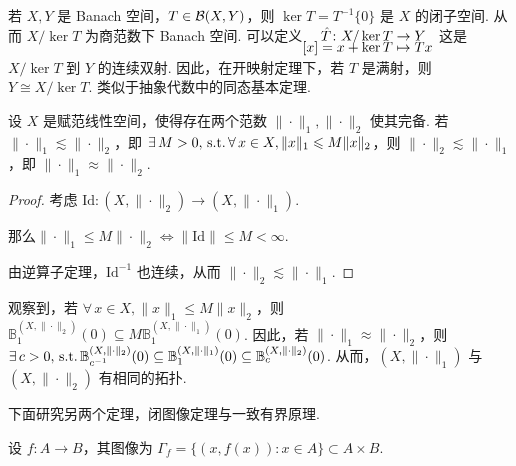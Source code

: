若 $X, Y$ 是 Banach 空间，$T \in \mathcal{B}(X,Y)$，则 $\ker T = T^{-1}\{0\}$ 是 $X$ 的闭子空间. 从而 $X/\ker T$ 为商范数下 Banach 空间.
可以定义$\setjot[-4]\begin{aligned}[t]
    \hat{T}\colon X/\ker T &\to Y \\
    [x]=x+\ker T &\mapsto  Tx
\end{aligned} $
这是 $X/\ker T$ 到 $Y$ 的连续双射.
因此，在开映射定理下，若 $T$ 是满射，则 $Y \cong X/\ker T$.
类似于抽象代数中的同态基本定理.

\begin{corollary}
    设 $X$ 是赋范线性空间，使得存在两个范数 $\|\cdot\|_1, \|\cdot\|_2$ 使其完备. 若 $\|\cdot\|_1 \lesssim \|\cdot\|_2$，即 $\exists\, M > 0, \operatorname{\,\text{s.t.}} \forall\, x \in X, \|x\|_1 \leqslant M\|x\|_2$，则 $\|\cdot\|_2 \lesssim \|\cdot\|_1$，即 $\|\cdot\|_1 \approx \|\cdot\|_2$.
\end{corollary}
\begin{proof}
    考虑 $\mathrm{Id}\colon (X, \|\cdot\|_2) \to (X, \|\cdot\|_1)$.\par
    那么$\| \cdot \|_1 \leq M \| \cdot \|_2 \iff \|\mathrm{Id}\| \le M < \infty$.\par
    由逆算子定理，$\mathrm{Id}^{-1}$ 也连续，从而 $\|\cdot\|_2 \lesssim \|\cdot\|_1$.
\end{proof}

观察到，若 $\forall\, x \in X, \|x\|_1 \leq M\|x\|_2$，则 $\mathbb{B}_1^{(X, \|\cdot\|_2)}(0) \subseteq M\mathbb{B}_1^{(X, \|\cdot\|_1)}(0)$.
因此，若 $\|\cdot\|_1 \approx \|\cdot\|_2$，则 $\exists\, c > 0, \operatorname{\,\text{s.t.}} \mathbb{B}_{c^{-1}}^{(X, \|\cdot\|_2)}(0) \subseteq \mathbb{B}_1^{(X, \|\cdot\|_1)}(0) \subseteq \mathbb{B}_c^{(X, \|\cdot\|_2)}(0)$.
从而，$(X, \|\cdot\|_1)$ 与 $(X, \|\cdot\|_2)$ 有相同的拓扑.

下面研究另两个定理，闭图像定理与一致有界原理.

\begin{definition}[图像]
    设 $f\colon A \to B$，其图像为 $\Gamma_f = \{(x, f(x)) \colon x \in A\} \subset A \times B$.
\end{definition}

